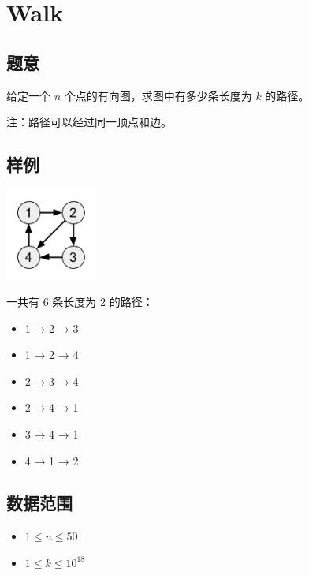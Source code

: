 \section{Walk}
\subsection*{题意}
给定一个 $n$ 个点的有向图，求图中有多少条长度为 $k$ 的路径。

注：路径可以经过同一顶点和边。
\subsection*{样例}
\begin{center}
\includegraphics[width=3cm]{./Pics/R.png}

\end{center}
\begin{center}
一共有 $6$ 条长度为 $2$ 的路径：
\begin{itemize}
\item \begin{center}1 → 2 → 3\end{center}
\item \begin{center}1 → 2 → 4\end{center}
\item \begin{center}2 → 3 → 4\end{center}
\item \begin{center}2 → 4 → 1\end{center}
\item \begin{center}3 → 4 → 1\end{center}
\item \begin{center}4 → 1 → 2\end{center}
\end{itemize}
\end{center}
\subsection*{数据范围}
\begin{itemize}
\item $1 \leq n \leq 50$
\item $1 \leq k \leq 10^{18}$
\end{itemize}


